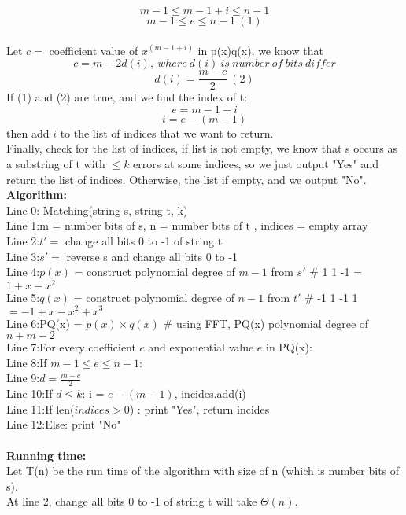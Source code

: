 \documentclass[11pt]{article}
\newenvironment{qparts}{\begin{enumerate}[{(}a{)}]}{\end{enumerate}}
\newcommand{\tab}{\hspace*{2em}}
\begin{document}
\begin{qparts}
$$m-1 \leqslant m - 1 + i \leqslant n -1$$
$$\boxed{m-1 \leqslant e \leqslant n -1}\ (1)$$
\\
Let $c = $ coefficient value of $x^{(m-1+i)}$ in p(x)q(x), we know that 
$$c = m  - 2d(i),\ where\ d(i)\ is\ number\ of\ bits\ differ$$
$$\boxed{d(i) = \frac{m-c}{2}}\ (2)$$
If (1) and (2) are true, and we find the index of t:
$$e = m-1 + i$$
$$\boxed{i = e- (m-1)}$$
then add $i$ to the list of indices that we want to return.\\
Finally, check for the list of indices, if list is not empty, we know that s occurs as a substring of t with $\leqslant k$ errors at some indices, so we just output "Yes" and return the list of indices. Otherwise, the list if empty, and we output "No".\\

\noindent
\textbf{Algorithm:}\\
\large{}
Line 0: Matching(string s, string t, k)\\
Line 1:\tab m = number bits of s, n = number bits of t , indices = empty array\\
Line 2:\tab $t\prime =$ change all bits 0 to -1 of string t \\
Line 3:\tab $s\prime =$ reverse s and change all bits 0 to -1\\
Line 4:\tab $p(x)$ = construct polynomial degree of $m-1$ from $s\prime$ \# 1 1 -1 = $1 + x - x^2$ \\
Line 5:\tab $q(x)$ = construct polynomial degree of $n-1$ from $t\prime$ \# -1 1 -1 1 $= -1 + x -x^2 + x^3$\\
Line 6:\tab PQ(x) = $p(x)\times q(x)$ \# using FFT, PQ(x) polynomial degree of $n+m-2$\\
Line 7:\tab For every coefficient  $c$ and exponential value $e$ in PQ(x):\\
Line 8:\tab\tab If $m- 1\leqslant e\leqslant n-1$:\\ 
Line 9:\tab\tab\tab $d = \frac{m - c}{2}$\\
Line 10:\tab\tab\tab If $d\leqslant k$: i = $e - (m-1)$, incides.add(i)\\
Line 11:\tab If len($indices > 0$) : print "Yes", return incides\\
Line 12:\tab Else: print "No"\\
\\
\Large{}
\noindent
\textbf{Running time:}\\
Let T(n) be the run time of the algorithm with size of n (which is number bits of s).\\
At line 2, change all bits 0 to -1 of string t will take $\Theta(n)$.\\

\end{qparts}
\end{document}
